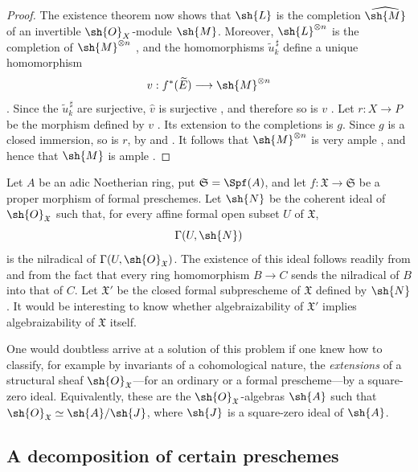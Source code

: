 \begin{proof}
The existence theorem  now shows that $\sh{L}$ is
the completion $\widehat{\sh{M}}$ of an invertible
$\sh{O}_X$-module $\sh{M}$.  Moreover,
$\sh{L}^{\otimes n}$ is the completion of
$\sh{M}^{\otimes n}$ , and the homomorphisms
$\widetilde{u}_k^{\,\sharp}$ define a unique homomorphism
\[
  v:f^*(\widetilde{E})
  \longrightarrow
  \sh{M}^{\otimes n}
\]
.  Since the
$\widetilde{u}_k^{\,\sharp}$ are surjective,
$\widehat{v}$ is surjective , and therefore so
is $v$ .  Let $r:X\to P$ be the morphism defined
by $v$ .  Its extension to the completions is
$g$.  Since $g$ is a closed immersion, so is $r$, by
 and .  It follows that
$\sh{M}^{\otimes n}$ is very ample , and hence
that $\sh{M}$ is ample .
\end{proof}

\begin{remark}[5.4.6]
\label{III.5.4.6}
Let $A$ be an adic Noetherian ring, put
$\mathfrak{S}=\Spf(A)$, and let
$f:\mathfrak{X}\to\mathfrak{S}$ be a proper morphism of formal
preschemes.  Let $\sh{N}$ be the coherent ideal of
$\sh{O}_{\mathfrak{X}}$ such that, for every affine formal open
subset $U$ of $\mathfrak{X}$,
\[
  \Gamma(U,\sh{N})
\]
is the nilradical of
$\Gamma(U,\sh{O}_{\mathfrak{X}})$.  The existence of this ideal
follows readily from  and from the fact that
every ring homomorphism $B\to C$ sends the nilradical of $B$ into
that of $C$.  Let $\mathfrak{X}'$ be the closed formal
subprescheme of $\mathfrak{X}$ defined by $\sh{N}$
.  It would be interesting to know whether
algebraizability of $\mathfrak{X}'$ implies algebraizability of
$\mathfrak{X}$ itself.

One would doubtless arrive at a solution of this problem if one
knew how to classify, for example by invariants
of a cohomological nature, the \emph{extensions} of a structural
sheaf $\sh{O}_{\mathfrak{X}}$---for an ordinary or a formal
prescheme---by a square-zero ideal.  Equivalently, these are the
$\sh{O}_{\mathfrak{X}}$-algebras $\sh{A}$ such that
$\sh{O}_{\mathfrak{X}}\simeq\sh{A}/\sh{J}$, where $\sh{J}$ is a
square-zero ideal of $\sh{A}$.
\end{remark}


\subsection{A decomposition of certain preschemes}
\label{subsection:III.5.5}

